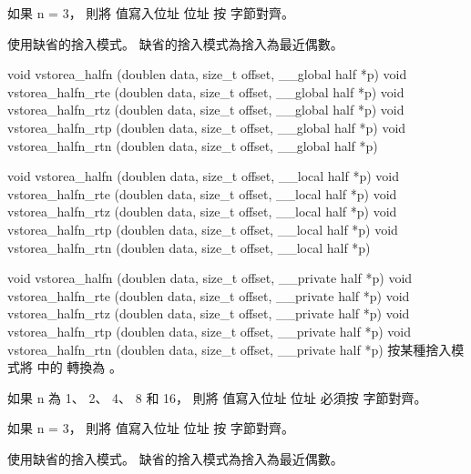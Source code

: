 如果 n = 3，
則將  值寫入位址 
位址  按
  字節對齊。

 使用缺省的捨入模式。
缺省的捨入模式為捨入為最近偶數。
\stopbuffer

void vstorea_halfn (doublen data,
	size_t offset,
	__global half *p)
void vstorea_halfn_rte (doublen data,
	size_t offset,
	__global half *p)
void vstorea_halfn_rtz (doublen data,
	size_t offset,
	__global half *p)
void vstorea_halfn_rtp (doublen data,
	size_t offset,
	__global half *p)
void vstorea_halfn_rtn (doublen data,
	size_t offset,
	__global half *p)

void vstorea_halfn (doublen data,
	size_t offset,
	__local half *p)
void vstorea_halfn_rte (doublen data,
	size_t offset,
	__local half *p)
void vstorea_halfn_rtz (doublen data,
	size_t offset,
	__local half *p)
void vstorea_halfn_rtp (doublen data,
	size_t offset,
	__local half *p)
void vstorea_halfn_rtn (doublen data,
	size_t offset,
	__local half *p)

void vstorea_halfn (doublen data,
	size_t offset,
	__private half *p)
void vstorea_halfn_rte (doublen data,
	size_t offset,
	__private half *p)
void vstorea_halfn_rtz (doublen data,
	size_t offset,
	__private half *p)
void vstorea_halfn_rtp (doublen data,
	size_t offset,
	__private half *p)
void vstorea_halfn_rtn (doublen data,
	size_t offset,
	__private half *p)
\stopbuffer
{}
按某種捨入模式將  中的  轉換為 。

如果 n 為 1、 2、 4、 8 和 16，
則將  值寫入位址 
位址  必須按
  字節對齊。

如果 n = 3，
則將  值寫入位址 
位址  按
  字節對齊。

 使用缺省的捨入模式。
缺省的捨入模式為捨入為最近偶數。
\stopbuffer
